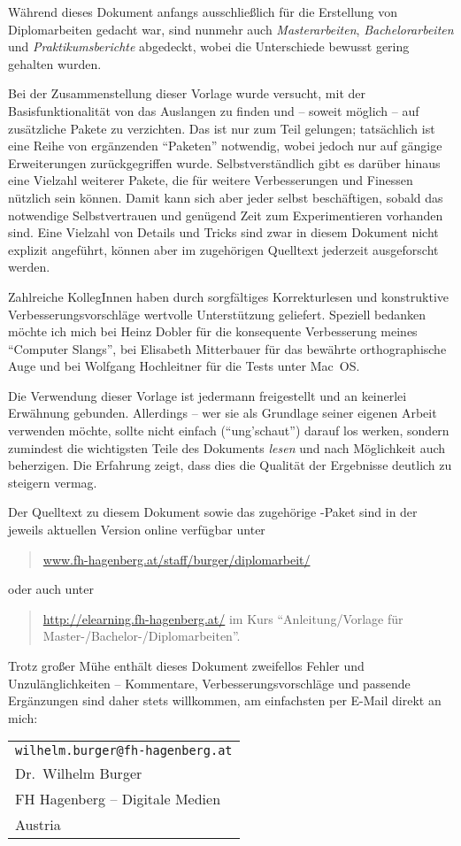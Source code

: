 Während dieses Dokument anfangs ausschließlich für die Erstellung
von Diplomarbeiten gedacht war, sind nunmehr auch  
\emph{Masterarbeiten}, \emph{Bachelor\-arbeiten} und \emph{Praktikumsberichte} 
abgedeckt, wobei die Unterschiede bewusst gering gehalten wurden.

Bei der Zusammenstellung dieser Vorlage wurde versucht, mit der
Basisfunktionalität von \latex das Auslangen zu finden und -- soweit möglich --
auf zusätzliche Pakete zu verzichten. Das ist nur zum Teil gelungen;
tat\-säch\-lich ist eine Reihe von ergänzenden "`Paketen"' notwendig, wobei jedoch
nur auf gängige Erweiterungen zurückgegriffen wurde.
Selbstverständlich gibt es darüber hinaus eine Vielzahl weiterer Pakete,
die für weitere Verbesserungen und Finessen nützlich sein können. Damit kann
sich aber jeder selbst beschäftigen, sobald das notwendige Selbstvertrauen und
genügend Zeit zum Experimentieren vorhanden sind.
Eine Vielzahl von Details und Tricks sind zwar in diesem Dokument nicht explizit
angeführt, können aber im zugehörigen Quelltext jederzeit ausgeforscht
werden.

Zahlreiche KollegInnen haben durch sorgfältiges Korrekturlesen und
konstruktive Verbesserungsvorschläge wertvolle Unterstützung
geliefert. Speziell bedanken möchte ich mich bei Heinz Dobler für
die konsequente Verbesserung meines "`Computer Slangs"', bei
Elisabeth Mitterbauer für das bewährte orthographische Auge und
bei Wolfgang Hochleitner für die Tests unter Mac~OS.

Die Verwendung dieser Vorlage ist jedermann freigestellt und an
keinerlei Erwähnung gebunden. Allerdings -- wer sie als Grundlage
seiner eigenen Arbeit verwenden möchte, sollte nicht einfach
("`ung'schaut"') darauf los werken, sondern zumindest die
wichtigsten Teile des Dokuments \emph{lesen} und nach Möglichkeit
auch beherzigen. Die Erfahrung zeigt, dass dies die Qualität der
Ergebnisse deutlich zu steigern vermag.

Der Quelltext zu diesem Dokument sowie das zugehörige
\latex-Paket sind in der jeweils aktuellen Version online
verfügbar unter
%
\begin{quote}
\url{www.fh-hagenberg.at/staff/burger/diplomarbeit/}
\end{quote}
%
oder auch unter
%
\begin{quote}
\url{http://elearning.fh-hagenberg.at/} \newline
im Kurs "`Anleitung/Vorlage für Master-/Bachelor-/Diplomarbeiten"'.
\end{quote}
%
Trotz großer Mühe enthält dieses Dokument zweifellos Fehler und Unzulänglichkeiten
-- Kommentare, Verbesserungsvorschläge und passende Ergänzungen
sind daher stets willkommen, am einfachsten per E-Mail direkt an mich:
\begin{center}%
\begin{tabular}{l}
\nolinkurl{wilhelm.burger@fh-hagenberg.at} \\
Dr.\ Wilhelm Burger \\
FH Hagenberg -- Digitale Medien\\
Austria
\end{tabular}
\end{center}

